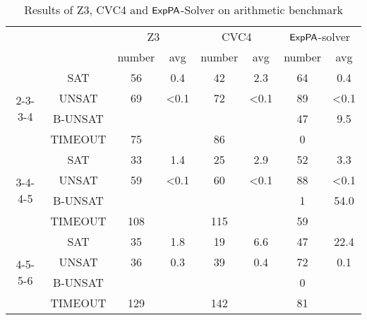 \begin{table*}[]
    \label{table:arithmetic}
    \caption{Results of Z3, CVC4 and ${\sf ExpPA}$-Solver on arithmetic benchmark}
    \centering
    \begin{tabular}{cc|cc|cc|cc}
        \multicolumn{1}{l}{} &  & \multicolumn{2}{c|}{Z3} & \multicolumn{2}{c|}{CVC4} & \multicolumn{2}{c}{${\sf ExpPA}$-solver} \\
        \multicolumn{1}{l}{} &  & number & avg & number & avg & number & avg \\ \hline
        \multirow{4}{*}{2-3-3-4} & SAT & 56 & 0.4 & 42 & 2.3 & 64 & 0.4 \\
         & UNSAT & 69 & \textless{}0.1 & 72 & \textless{}0.1 & 89 & \textless{}0.1 \\
         & B-UNSAT & \multicolumn{1}{l}{} & \multicolumn{1}{l|}{} & \multicolumn{1}{l}{} & \multicolumn{1}{l|}{} & 47 & 9.5 \\
         & TIMEOUT & 75 &  & 86 &  & 0 &  \\ \hline
        \multirow{4}{*}{3-4-4-5} & SAT & 33 & 1.4 & 25 & 2.9 & 52 & 3.3 \\
         & UNSAT & 59 & \textless{}0.1 & 60 & \textless{}0.1 & 88 & \textless{}0.1 \\
         & B-UNSAT & \multicolumn{1}{l}{} & \multicolumn{1}{l|}{} & \multicolumn{1}{l}{} & \multicolumn{1}{l|}{} & 1 & 54.0 \\
         & TIMEOUT & 108 &  & 115 &  & 59 &  \\ \hline
        \multirow{4}{*}{4-5-5-6} & SAT & 35 & 1.8 & 19 & 6.6 & 47 & 22.4 \\
         & UNSAT & 36 & 0.3 & 39 & 0.4 & 72 & 0.1 \\
         & B-UNSAT & \multicolumn{1}{l}{} & \multicolumn{1}{l|}{} & \multicolumn{1}{l}{} & \multicolumn{1}{l|}{} & 0 &  \\
         & TIMEOUT & 129 &  & 142 &  & 81 & 
        \end{tabular}
\end{table*}

